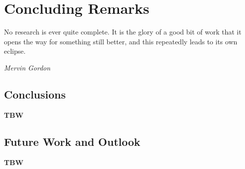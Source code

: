 
\chapter{Concluding Remarks}
	\vspace{-2 cm}
	\epigraph{No research is ever quite complete. It is the glory of a good bit of work that it opens the way for something still better, and this repeatedly leads to its own eclipse.}{\textit{Mervin Gordon}}

\section{Conclusions}

\textbf{TBW}
        
\section{Future Work and Outlook}

\textbf{TBW}

